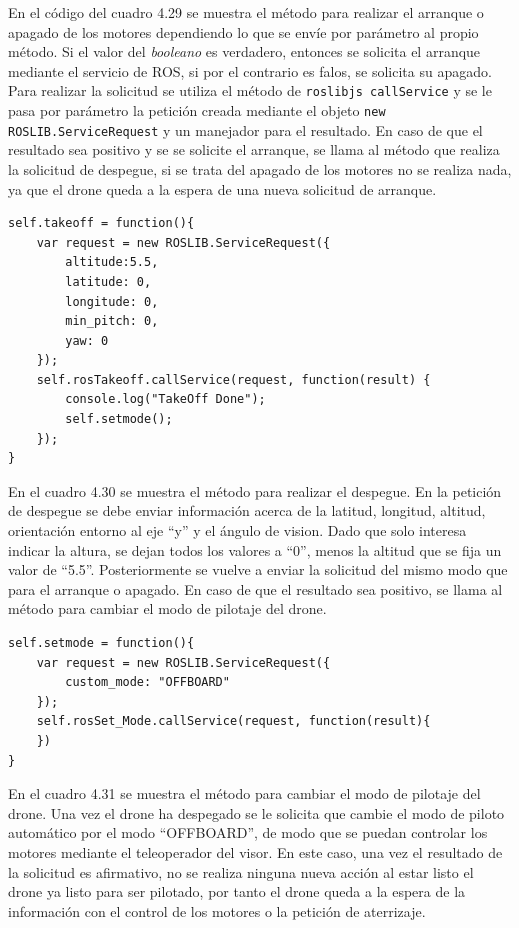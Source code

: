 En el código del cuadro 4.29 se muestra el método para realizar el arranque o apagado de los motores dependiendo lo que se envíe por parámetro al propio método. Si el valor del \textit{booleano} es verdadero, entonces se solicita el arranque mediante el servicio de ROS, si por el contrario es falos, se solicita su apagado. Para realizar la solicitud se utiliza el método de \texttt{roslibjs callService} y se le pasa por parámetro la petición creada mediante el objeto \texttt{new ROSLIB.ServiceRequest} y un manejador para el resultado. En caso de que el resultado sea positivo y se se solicite el arranque, se llama al método que realiza la solicitud de despegue, si se trata del apagado de los motores no se realiza nada, ya que el drone queda a la espera de una nueva solicitud de arranque.

\begin{lstlisting}[caption= Método para arrancar o apagar los motores del drone, label=cod.takeoff]
self.takeoff = function(){
	var request = new ROSLIB.ServiceRequest({
		altitude:5.5,
		latitude: 0,
		longitude: 0,
		min_pitch: 0,
		yaw: 0
	});
	self.rosTakeoff.callService(request, function(result) {
		console.log("TakeOff Done");
		self.setmode();
	});
}
\end{lstlisting}

En el cuadro 4.30 se muestra el método para realizar el despegue. En la petición de despegue se debe enviar información acerca de la latitud, longitud, altitud, orientación entorno al eje ``y'' y el ángulo de vision. Dado que solo interesa indicar la altura, se dejan todos los valores a ``0'', menos la altitud que se fija un valor de ``5.5''. Posteriormente se vuelve a enviar la solicitud del mismo modo que para el arranque o apagado. En caso de que el resultado sea positivo, se llama al método para cambiar el modo de pilotaje del drone.

\begin{lstlisting}[caption= Método para cambiar el modo de pilotaje, label=cod.setMode]
self.setmode = function(){
	var request = new ROSLIB.ServiceRequest({
		custom_mode: "OFFBOARD"
	});
	self.rosSet_Mode.callService(request, function(result){
	})
}
\end{lstlisting}

En el cuadro 4.31 se muestra el método para cambiar el modo de pilotaje del drone. Una vez el drone ha despegado se le solicita que cambie el modo de piloto automático por el modo ``OFFBOARD'', de modo que se puedan controlar los motores mediante el teleoperador del visor. En este caso, una vez el resultado de la solicitud es afirmativo, no se realiza ninguna nueva acción al estar listo el drone ya listo para ser pilotado, por tanto el drone queda a la espera de la información con el control de los motores o la petición de aterrizaje.

